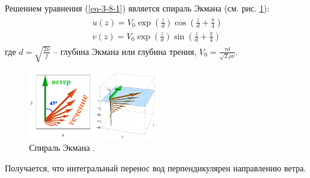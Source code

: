 Решением уравнения (\ref{eq-3-8-1}) является спираль Экмана (см. рис. \ref{fig:ekman_spiral}):
\begin{align}
\begin{split}
u(z)=V_0\exp\left(\frac{z}{d}\right)\cos\left(\frac{z}{d}+\frac{\pi}{4}\right)
\\
v(z)=V_0\exp\left(\frac{z}{d}\right)\sin\left(\frac{z}{d}+\frac{\pi}{4}\right)
\end{split}
\end{align}
где $d=\sqrt{\frac{2\nu}{f}}$ -- глубина Экмана или глубина трения, $V_0=\frac{\tau d}{\sqrt{2}\rho\nu}$.

\begin{figure}[!ht]
\centering
\includegraphics[width=0.5\textwidth]{images/ekman_spiral.png}
\caption{Спираль Экмана \cite{Носов-2019-7}.}\label{fig:ekman_spiral}
\end{figure}

Получается, что интегральный перенос вод перпендикулярен направлению ветра.
